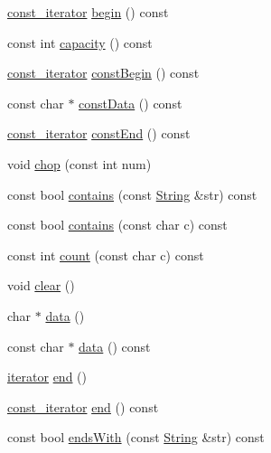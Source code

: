 \begin{DoxyCompactItemize}
\item 
\hyperlink{classprism_1_1_string_a8b46f0fbe9c5c94ba892975242e3ab68}{const\+\_\+iterator} \hyperlink{classprism_1_1_string_ab3b18cfb5a3de6481f2f3d82bf5f0ef6}{begin} () const 
\item 
const int \hyperlink{classprism_1_1_string_a79a0e1b2a185376d36935ff637ba5678}{capacity} () const 
\item 
\hyperlink{classprism_1_1_string_a8b46f0fbe9c5c94ba892975242e3ab68}{const\+\_\+iterator} \hyperlink{classprism_1_1_string_a1c06ffe23cc1c0d552a2f5a32e40ba89}{const\+Begin} () const 
\item 
const char $\ast$ \hyperlink{classprism_1_1_string_ac336a0e353c9e8f27c9867171d70dd5d}{const\+Data} () const 
\item 
\hyperlink{classprism_1_1_string_a8b46f0fbe9c5c94ba892975242e3ab68}{const\+\_\+iterator} \hyperlink{classprism_1_1_string_a650b471cb36e6918361136895abef8bb}{const\+End} () const 
\item 
void \hyperlink{classprism_1_1_string_a6a0006f4412961eab5625d6366f60137}{chop} (const int num)
\item 
const bool \hyperlink{classprism_1_1_string_a6c449b65e60b931cbb9c951e442f1153}{contains} (const \hyperlink{classprism_1_1_string}{String} \&str) const 
\item 
const bool \hyperlink{classprism_1_1_string_ade50c4d728c1d7dfce7713a9c48e4033}{contains} (const char c) const 
\item 
const int \hyperlink{classprism_1_1_string_adde5ee34a762ec89df4354f562cb4c39}{count} (const char c) const 
\item 
void \hyperlink{classprism_1_1_string_adcfa3f36badcb9e84c2c956a6b29c865}{clear} ()
\item 
char $\ast$ \hyperlink{classprism_1_1_string_aa70973a523fcfbaa608645085f004d29}{data} ()
\item 
const char $\ast$ \hyperlink{classprism_1_1_string_a8f28ba12d030e7f28fe533901dad97ea}{data} () const 
\item 
\hyperlink{classprism_1_1_string_adacc7975837e5fff95d70690777fb330}{iterator} \hyperlink{classprism_1_1_string_a66cac7d74458715877d381c036bd1698}{end} ()
\item 
\hyperlink{classprism_1_1_string_a8b46f0fbe9c5c94ba892975242e3ab68}{const\+\_\+iterator} \hyperlink{classprism_1_1_string_ada5833ed658db9ed7cd0d847b727b1c3}{end} () const 
\item 
const bool \hyperlink{classprism_1_1_string_a3cfa97542dcbb79a4db5715dcde850a5}{ends\+With} (const \hyperlink{classprism_1_1_string}{String} \&str) const 

\end{DoxyCompactItemize}

